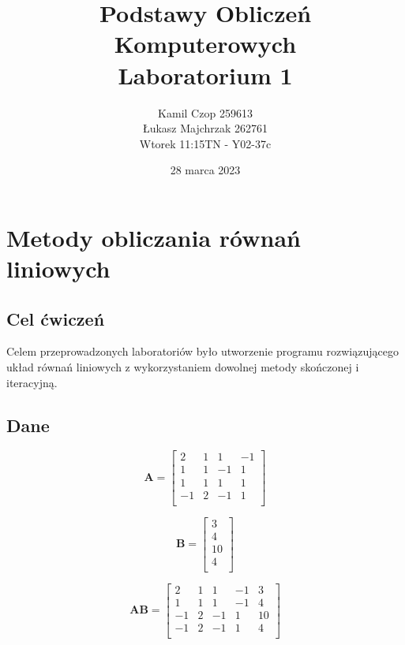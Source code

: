 \documentclass{article}
\title{Podstawy Obliczeń Komputerowych\\ Laboratorium 1}
\author{Kamil Czop 259613 \\ Łukasz Majchrzak 262761 \\ Wtorek 11:15TN - Y02-37c}
\date{28 marca 2023}
\begin{document}
\maketitle
\section{Metody obliczania równań liniowych}
\subsection{Cel ćwiczeń}
Celem przeprowadzonych laboratoriów było utworzenie programu rozwiązującego układ równań liniowych z wykorzystaniem dowolnej metody skończonej i iteracyjną.
\subsection{Dane}
\begin{figure}[H]
    \begin{multicols}{3}
        \begin{equation*}
         \mathbf{A}=\begin{bmatrix}2 & 1 & 1 & -1\\1 & 1 & -1 & 1\\ 1 & 1 & 1 & 1 \\ -1 & 2 & -1 & 1 \\\end{bmatrix}
        \end{equation*}
    \par
        \begin{equation*}
         \mathbf{B}=\begin{bmatrix}3 \\ 4 \\ 10 \\ 4\\\end{bmatrix}
        \end{equation*}
    \par
        \begin{equation*}
         \mathbf{AB}=\begin{bmatrix}2 & 1 & 1 & -1 & 3\\1 & 1 & 1 & -1 & 4\\ -1 & 2 & -1 & 1 & 10\\ -1 & 2 & -1 & 1 & 4\\\end{bmatrix}
        \end{equation*}
    \end{multicols}
\end{figure}
\end{document}
